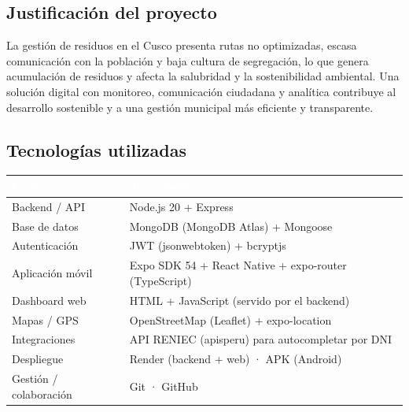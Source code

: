 \documentclass[11pt,a4paper]{article}
\newcommand{\theadcell}[1]{%
  \cellcolor{azuloscuro}\textcolor{white}{\textbf{\small #1}}}
\begin{document}
\subsection{Justificación del proyecto}
La gestión de residuos en el Cusco presenta rutas no optimizadas, escasa comunicación con la población y baja cultura de segregación, lo que genera acumulación de residuos y afecta la salubridad y la sostenibilidad ambiental. Una solución digital con monitoreo, comunicación ciudadana y analítica contribuye al desarrollo sostenible y a una gestión municipal más eficiente y transparente.

\subsection{Tecnologías utilizadas}
\begin{table}[H]
\centering
\renewcommand{\arraystretch}{1.3}
\begin{tabularx}{\textwidth}{|l|X|}
\hline
\theadcell{Capa} & \theadcell{Tecnología} \\
\hline
Backend / API & Node.js 20 + Express \\
\hline
Base de datos & MongoDB (MongoDB Atlas) + Mongoose \\
\hline
Autenticación & JWT (jsonwebtoken) + bcryptjs \\
\hline
Aplicación móvil & Expo SDK 54 + React Native + expo-router (TypeScript) \\
\hline
Dashboard web & HTML + JavaScript (servido por el backend) \\
\hline
Mapas / GPS & OpenStreetMap (Leaflet) + expo-location \\
\hline
Integraciones & API RENIEC (apisperu) para autocompletar por DNI \\
\hline
Despliegue & Render (backend + web) · APK (Android) \\
\hline
Gestión / colaboración & Git · GitHub \\
\hline
\end{tabularx}
\end{table}
\end{document}

